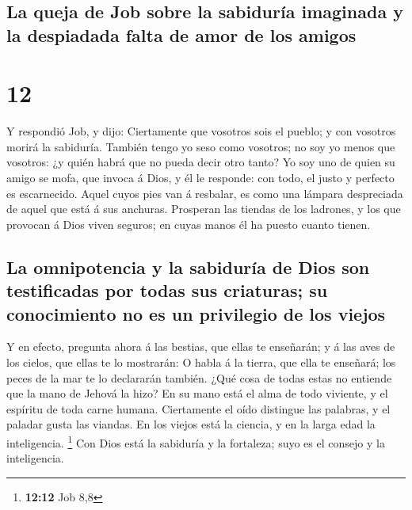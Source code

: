 \hypertarget{la-queja-de-job-sobre-la-sabiduruxeda-imaginada-y-la-despiadada-falta-de-amor-de-los-amigos}{%
\subsection{La queja de Job sobre la sabiduría imaginada y la despiadada
falta de amor de los
amigos}\label{la-queja-de-job-sobre-la-sabiduruxeda-imaginada-y-la-despiadada-falta-de-amor-de-los-amigos}}

\hypertarget{section-11}{%
\section{12}\label{section-11}}

 Y respondió Job, y dijo:  Ciertamente que
vosotros sois el pueblo; y con vosotros morirá la sabiduría.
 También tengo yo seso como vosotros; no soy yo menos que
vosotros: ¿y quién habrá que no pueda decir otro tanto?  Yo
soy uno de quien su amigo se mofa, que invoca á Dios, y él le responde:
con todo, el justo y perfecto es escarnecido.  Aquel cuyos
pies van á resbalar, es como una lámpara despreciada de aquel que está á
sus anchuras.  Prosperan las tiendas de los ladrones, y los
que provocan á Dios viven seguros; en cuyas manos él ha puesto cuanto
tienen.

\hypertarget{la-omnipotencia-y-la-sabiduruxeda-de-dios-son-testificadas-por-todas-sus-criaturas-su-conocimiento-no-es-un-privilegio-de-los-viejos}{%
\subsection{La omnipotencia y la sabiduría de Dios son testificadas por
todas sus criaturas; su conocimiento no es un privilegio de los
viejos}\label{la-omnipotencia-y-la-sabiduruxeda-de-dios-son-testificadas-por-todas-sus-criaturas-su-conocimiento-no-es-un-privilegio-de-los-viejos}}

 Y en efecto, pregunta ahora á las bestias, que ellas te
enseñarán; y á las aves de los cielos, que ellas te lo mostrarán:
 O habla á la tierra, que ella te enseñará; los peces de la
mar te lo declararán también.  ¿Qué cosa de todas estas no
entiende que la mano de Jehová la hizo?  En su mano está el
alma de todo viviente, y el espíritu de toda carne humana. 
Ciertamente el oído distingue las palabras, y el paladar gusta las
viandas.  En los viejos está la ciencia, y en la larga edad
la inteligencia. \footnote{\textbf{12:12} Job 8,8}  Con
Dios está la sabiduría y la fortaleza; suyo es el consejo y la
inteligencia.

